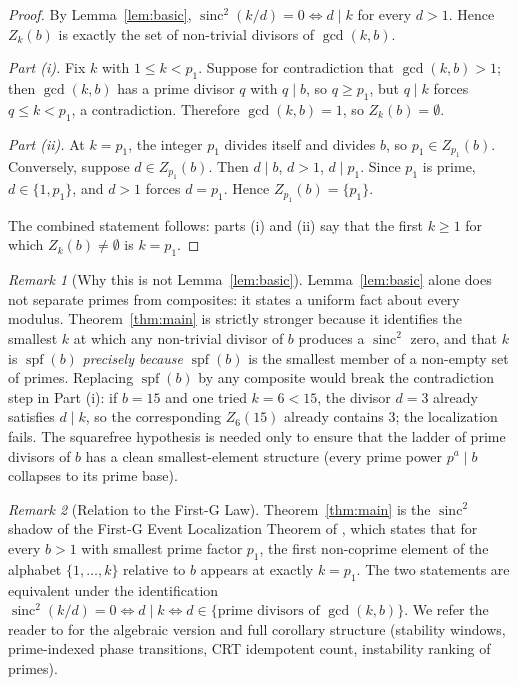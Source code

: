 \documentclass[11pt,reqno]{amsart}
\theoremstyle{plain}
\theoremstyle{remark}
\newtheorem*{remark}{Remark}
\DeclareMathOperator{\sinc}{sinc}
\DeclareMathOperator{\spf}{spf}
\begin{document}
\begin{proof}
By Lemma~\ref{lem:basic}, $\sinc^2(k/d) = 0 \iff d \mid k$ for every
$d > 1$. Hence $Z_k(b)$ is exactly the set of non-trivial divisors
of $\gcd(k, b)$.

\emph{Part (i).} Fix $k$ with $1 \le k < p_1$. Suppose for
contradiction that $\gcd(k, b) > 1$; then $\gcd(k, b)$ has a prime
divisor $q$ with $q \mid b$, so $q \ge p_1$, but $q \mid k$ forces
$q \le k < p_1$, a contradiction. Therefore $\gcd(k, b) = 1$, so
$Z_k(b) = \emptyset$.

\emph{Part (ii).} At $k = p_1$, the integer $p_1$ divides itself and
divides $b$, so $p_1 \in Z_{p_1}(b)$. Conversely, suppose
$d \in Z_{p_1}(b)$. Then $d \mid b$, $d > 1$, $d \mid p_1$. Since
$p_1$ is prime, $d \in \{1, p_1\}$, and $d > 1$ forces $d = p_1$.
Hence $Z_{p_1}(b) = \{p_1\}$.

The combined statement follows: parts (i) and (ii) say that the
first $k \ge 1$ for which $Z_k(b) \ne \emptyset$ is $k = p_1$.
\end{proof}

\begin{remark}[Why this is not Lemma~\ref{lem:basic}]
\label{rem:nontrivial}
Lemma~\ref{lem:basic} alone does not separate primes from
composites: it states a uniform fact about every modulus.
Theorem~\ref{thm:main} is strictly stronger because it identifies
the smallest $k$ at which any non-trivial divisor of $b$ produces
a $\sinc^2$ zero, and that $k$ is $\spf(b)$ \emph{precisely
because} $\spf(b)$ is the smallest member of a non-empty set of
primes. Replacing $\spf(b)$ by any composite would break the
contradiction step in Part (i): if $b = 15$ and one tried
$k = 6 < 15$, the divisor $d = 3$ already satisfies $d \mid k$, so
the corresponding $Z_6(15)$ already contains $3$; the localization
fails. The squarefree hypothesis is needed only to ensure that the
ladder of prime divisors of $b$ has a clean smallest-element
structure (every prime power
$p^a \mid b$ collapses to its prime base).
\end{remark}

\begin{remark}[Relation to the First-G Law]\label{rem:first-g}
Theorem~\ref{thm:main} is the $\sinc^2$ shadow of the First-G Event
Localization Theorem of \cite{J41}, which states that for every
$b > 1$ with smallest prime factor $p_1$, the first non-coprime
element of the alphabet $\{1, \ldots, k\}$ relative to $b$ appears
at exactly $k = p_1$. The two statements are equivalent under the
identification $\sinc^2(k/d) = 0 \iff d \mid k \iff d \in
\{\text{prime divisors of } \gcd(k, b)\}$. We refer the reader to
\cite{J41} for the algebraic version and full corollary structure
(stability windows, prime-indexed phase transitions, CRT idempotent
count, instability ranking of primes).
\end{remark}
\end{document}
